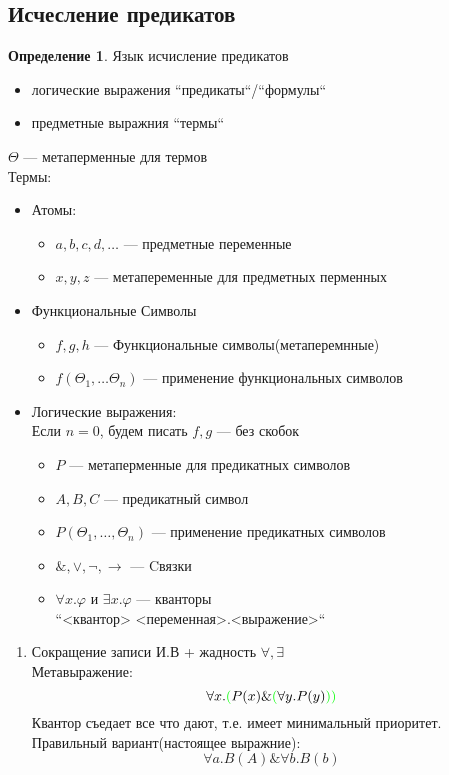\documentclass[oneside]{book}
\theoremstyle{plain}
\theoremstyle{remark}
\theoremstyle{definition}
\newtheorem*{definition}{Определение}
\begin{document}
\subsection{Исчесление предикатов}
\label{sec:orgf2dc57d}
\begin{definition}
Язык исчисление предикатов
\begin{itemize}
\item логические выражения ``предикаты``/``формулы``
\item предметные выражния ``термы``
\end{itemize}
\(\Theta\) --- метаперменные для термов \\
Термы:
\begin{itemize}
\item Атомы:
\begin{itemize}
\item \(a, b, c, d, \dots\) --- предметные переменные
\item \(x, y, z\) --- метапеременные для предметных перменных
\end{itemize}
\item Функциональные Символы
\begin{itemize}
\item \(f, g, h\) --- Функциональные символы(метаперемнные)
\item \(f(\Theta_1, \dots \Theta_n)\) --- применение функциональных символов
\end{itemize}
\item Логические выражения: \\
\color{gray}Если \(n = 0\), будем писать \(f, g\) --- без скобок\color{black}
\begin{itemize}
\item \(P\) --- метаперменные для предикатных символов
\item \(A, B, C\) --- предикатный символ
\item \(P(\Theta_1, \dots, \Theta_n)\) --- применение предикатных символов
\item \(\&, \vee, \neg, \to\) --- Cвязки
\item \(\forall x.\varphi\) и \(\exists x.\varphi\) --- кванторы \\
\color{gray}``<квантор> <переменная>.<выражение>``\color{black} \\
\end{itemize}
\end{itemize}
\end{definition}
\begin{enumerate}
\item Сокращение записи
\label{sec:orga1fa527}
И.В + жадность \(\forall, \exists\) \\
Метавыражение:
\[ \forall x. \color{green}(\color{black}P(x) \& \color{green}(\color{black}\forall y. P(y) \color{green}))\color{black} \]
Квантор съедает все что дают, т.е. имеет минимальный приоритет. \\
Правильный вариант(настоящее выражние):
\[ \forall a. B(A) \& \forall b. B(b) \]
\end{enumerate}
\end{document}
